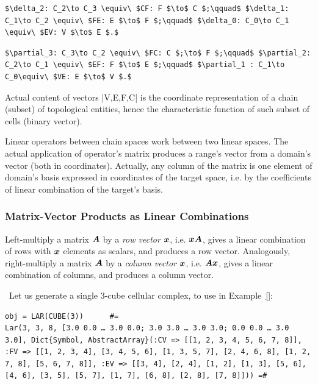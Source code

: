 {\begin{remark}
\begin{end}
\begin{lstlisting}[language=JuliaLocal, style=julia, mathescape = true]
$\delta_2: C_2\to C_3 \equiv\ $CF: F $\to$ C $;\qquad$ $\delta_1: C_1\to C_2 \equiv\ $FE: E $\to$ F $;\qquad$ $\delta_0: C_0\to C_1 \equiv\ $EV: V $\to$ E $.$
\end{lstlisting}

\begin{lstlisting}[language=JuliaLocal, style=julia, mathescape = true]
$\partial_3: C_3\to C_2 \equiv\ $FC: C $;\to$ F $;\qquad$ $\partial_2: C_2\to C_1 \equiv\ $EF: F $\to$ E $;\qquad$ $\partial_1 : C_1\to C_0\equiv\ $VE: E $\to$ V $.$  
\end{lstlisting}

\begin{remark}
Actual content of vectors |V,E,F,C| is the coordinate representation of a chain (subset) of topological entities, hence the characteristic function of such subset of cells  (binary vector).
\end{remark}

\begin{remark}
Linear operators between chain spaces work between two linear spaces. The actual application of operator’s matrix produces a range’s vector from a domain’s vector (both in coordinates). Actually, any column of the matrix is one element of domain’s basis  expressed in coordinates of the target space, i.e. by the coefficients of linear combination of the target’s basis.
\end{remark}


\subsubsection*{Matrix-Vector Products as Linear Combinations}
Left-multiply a matrix ${\mbox{\boldmath $A$}}$ by a \emph{row vector} ${\mbox{\boldmath $x$}}$, i.e. ${\mbox{\boldmath $x$}}{\mbox{\boldmath $A$}}$, gives a linear combination of  rows with ${\mbox{\boldmath $x$}}$ elements as scalars, and produces a row vector. 
Analogously, right-multiply a matrix ${\mbox{\boldmath $A$}}$ by a \emph{column vector} ${\mbox{\boldmath $x$}}$, i.e. ${\mbox{\boldmath $A$}}{\mbox{\boldmath $x$}}$, gives a linear combination of  columns, and produces a column vector. 

\begin{coding}\
Let us generate a single 3-cube cellular complex, to use in Example~\ref{}:
\begin{lstlisting}[language=JuliaLocal, style=julia, mathescape = true] 
obj = LAR(CUBE(3))  	#=
Lar(3, 3, 8, [3.0 0.0 … 3.0 0.0; 3.0 3.0 … 3.0 3.0; 0.0 0.0 … 3.0 3.0], Dict{Symbol, AbstractArray}(:CV => [[1, 2, 3, 4, 5, 6, 7, 8]], :FV => [[1, 2, 3, 4], [3, 4, 5, 6], [1, 3, 5, 7], [2, 4, 6, 8], [1, 2, 7, 8], [5, 6, 7, 8]], :EV => [[3, 4], [2, 4], [1, 2], [1, 3], [5, 6], [4, 6], [3, 5], [5, 7], [1, 7], [6, 8], [2, 8], [7, 8]])) =#


\end{lstlisting}
\end{coding}
\end{end}
\end{remark}}

